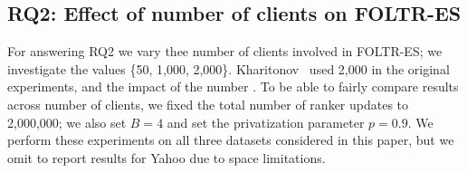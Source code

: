 %

\subsection{RQ2: Effect of number of clients on FOLTR-ES}

For answering RQ2 we vary thee number of clients involved in FOLTR-ES; we investigate the values \{50, 1,000, 2,000\}. Kharitonov~\cite{kharitonov2019federated} used 2,000 in the original experiments, and the impact of the number . To be able to fairly compare results across number of clients, we fixed the total number of ranker updates to 2,000,000; we also set $B = 4$ and set the privatization parameter $p=0.9$. We perform these experiments on all three datasets considered in this paper, but we omit to report results for Yahoo due to space limitations. 


